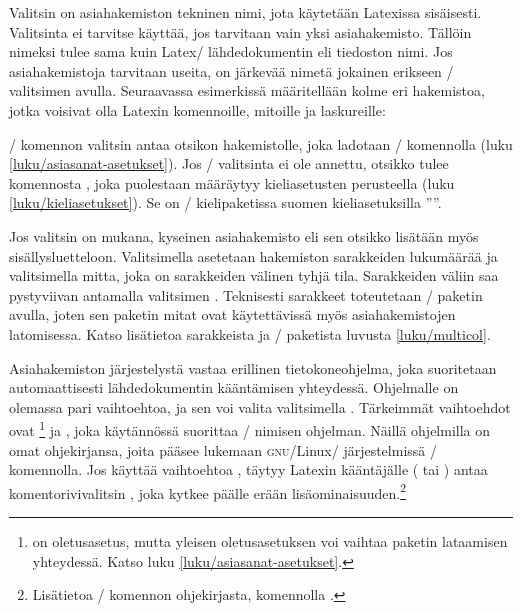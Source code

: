 Valitsin  on asiahakemiston tekninen nimi, jota käytetään
Latexissa sisäisesti. Valitsinta ei tarvitse käyttää, jos tarvitaan vain
yksi asiahakemisto. Tällöin nimeksi tulee sama kuin Latex\-/
lähdedokumentin eli tiedoston nimi. Jos asiahakemistoja tarvitaan
useita, on järkevää nimetä jokainen erikseen \-/ valitsimen
avulla. Seuraavassa esimerkissä määritellään kolme eri hakemistoa, jotka
voisivat olla Latexin komennoille, mitoille ja laskureille:

\begin{koodilohkosis}
\makeindex[name=komennot, title=Komennot, columns=2, intoc]
\makeindex[name=mitat,    title=Mitat,    columns=2, intoc]
\makeindex[name=laskurit, title=Laskurit, columns=2, intoc]
\end{koodilohkosis}

\noindent
{}\-/ komennon valitsin  antaa otsikon
hakemistolle, joka ladotaan \-/ komennolla (luku
\ref{luku/asiasanat-asetukset}). Jos \-/ valitsinta ei ole
annettu, otsikko tulee komennosta , joka puolestaan
määräytyy kieliasetusten perusteella (luku \ref{luku/kieliasetukset}).
Se on \-/ kielipaketissa suomen kieliasetuksilla
''\indexname''.

Jos valitsin  on mukana, kyseinen asiahakemisto eli sen
otsikko lisätään myös sisällysluetteloon. Valitsimella 
asetetaan hakemiston sarakkeiden lukumäärää ja valitsimella
 mitta, joka on sarakkeiden välinen tyhjä tila.
Sarakkeiden väliin saa pystyviivan antamalla valitsimen
. Teknisesti sarakkeet toteutetaan
\-/ paketin avulla, joten sen paketin mitat ovat
käytettävissä myös asiahakemistojen latomisessa. Katso lisätietoa
sarakkeista ja \-/ paketista luvusta
\ref{luku/multicol}.

Asiahakemiston järjestelystä vastaa erillinen tietokoneohjelma, joka
suoritetaan automaattisesti lähdedokumentin kääntämisen yhteydessä.
Ohjelmalle on olemassa pari vaihtoehtoa, ja sen voi valita valitsimella
. Tärkeimmät vaihtoehdot ovat
\footnote{ on
  oletusasetus, mutta yleisen oletusasetuksen voi vaihtaa paketin
  lataamisen yhteydessä. Katso luku \ref{luku/asiasanat-asetukset}.} ja
, joka käytännössä suorittaa \-/ nimisen
ohjelman. Näillä ohjelmilla on omat ohjekirjansa, joita pääsee lukemaan
\textsc{gnu}/\katk Linux\-/ järjestelmissä \-/ komennolla.
Jos käyttää vaihtoehtoa , täytyy Latexin
kääntäjälle ( tai ) antaa
komentorivivalitsin , joka kytkee päälle erään
lisäominaisuuden.\footnote{Lisätietoa \-/ komennon
  ohjekirjasta, komennolla .}

